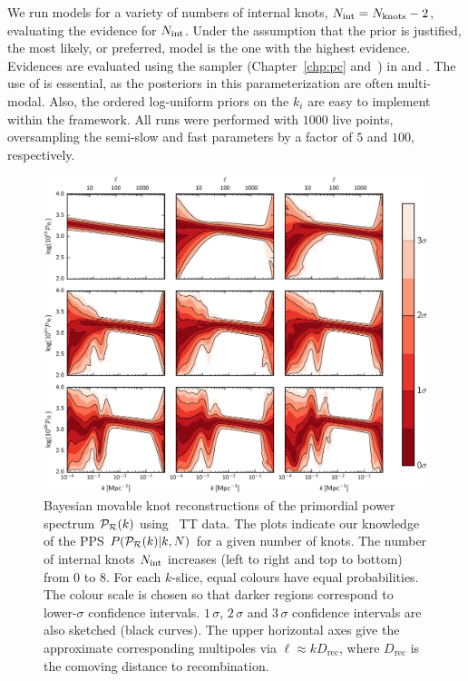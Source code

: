 We run models for a variety of numbers of internal knots, \(N_\mathrm{int} =N_\mathrm{knots} -2\), evaluating the evidence for \(N_\mathrm{int}\).  Under the assumption that the prior is justified, the most likely, or preferred, model is the one with the highest evidence.  Evidences are evaluated using the \PolyChord{} sampler (Chapter~\ref{chp:pc} and~\citealp{polychordletter,polychordpaper}) in \CAMB{} and \CosmoMC{}. The use of \PolyChord{} is essential, as the posteriors in this parameterization are often multi-modal. Also, the ordered log-uniform priors on the \(k_i\) are easy to implement within the \PolyChord{} framework. All runs were performed with \(1000\) live points, oversampling the semi-slow and fast parameters by a factor of \(5\) and \(100\), respectively.

\begin{figure}[tp]
  \includegraphics[width=\textwidth]{chapters/pps_reconstruction/figures/array}
  \caption{Bayesian movable knot reconstructions of the primordial power spectrum \(\mathcal{P}_\mathcal{R}(k)\) using \Planck\ TT data.  The plots indicate our knowledge of the PPS \(P(\mathcal{P}_\mathcal{R}(k)|k,N)\) for a given number of knots.  The number of internal knots \(N_\mathrm{int}\) increases (left to right and top to bottom) from \(0\) to \(8\).  For each \(k\)-slice, equal colours have equal probabilities. The colour scale is chosen so that darker regions correspond to lower-\(\sigma\) confidence intervals.  \(1\,\sigma\), \(2\,\sigma \) and \(3\,\sigma \) confidence intervals are also sketched (black curves).  The upper horizontal axes give the approximate corresponding multipoles via \(\ell \approx kD_\mathrm{rec}\), where \(D_\mathrm{rec}\) is the comoving distance to recombination.}\label{fig:Pkr0}
\end{figure}


